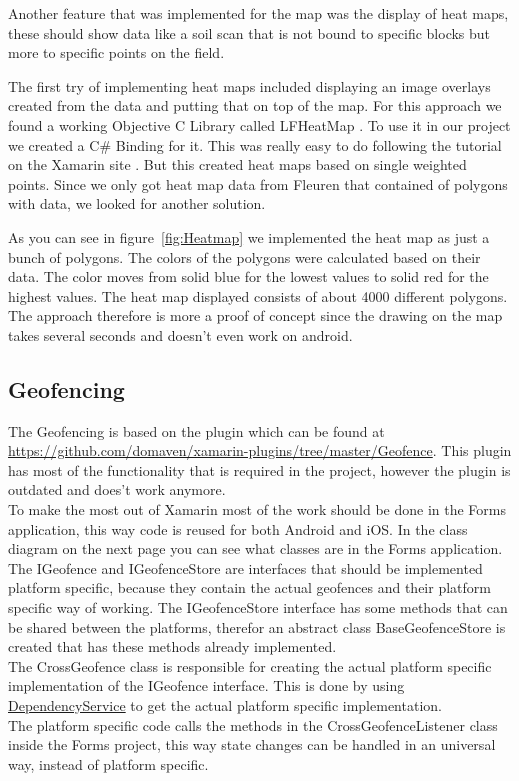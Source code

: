 Another feature that was implemented for the map was the display of heat maps, these should show data like a soil scan that is not bound to specific blocks but more to specific points on the field. 

The first try of implementing heat maps included displaying an image \glspl{overlay} created from the data and putting that on top of the map. For this approach we found a working Objective C Library called LFHeatMap \cite{LFHeatMaps}. To use it in our project we created a C\# Binding for it. 
This was really easy to do following the tutorial on the Xamarin site \cite{bindingtut}. But this created heat maps based on single weighted points. Since we only got heat map data from Fleuren that contained of polygons with data, we looked for another solution.

As you can see in figure~\ref{fig:Heatmap} we implemented the heat map as just a bunch of polygons. The colors of the polygons were calculated based on their data. The color moves from solid blue for the lowest values to solid red for the highest values. The heat map displayed consists of about 4000 different polygons. The approach therefore is more a proof of concept since the drawing on the map takes several seconds and doesn't even work on android.


\subsection{Geofencing}

The Geofencing is based on the plugin which can be found at \url{https://github.com/domaven/xamarin-plugins/tree/master/Geofence}. This plugin has most of the functionality that is required in the project, however the plugin is outdated and does't work anymore. \\
To make the most out of Xamarin most of the work should be done in the Forms application, this way code is reused for both Android and iOS. In the class diagram on the next page you can see what classes are in the Forms application. \\ The IGeofence and IGeofenceStore are interfaces that should be implemented platform specific, because they contain the actual geofences and their platform specific way of working. The IGeofenceStore interface has some methods that can be shared between the platforms, therefor an abstract class BaseGeofenceStore is created that has these methods already implemented.\\
The CrossGeofence class is responsible for creating the actual platform specific implementation of the IGeofence interface. This is done by using \href{https://developer.xamarin.com/guides/xamarin-forms/dependency-service/}{DependencyService} to get the actual platform specific implementation. \\
The platform specific code calls the methods in the CrossGeofenceListener class inside the Forms project, this way state changes can be handled in an universal way, instead of platform specific.

